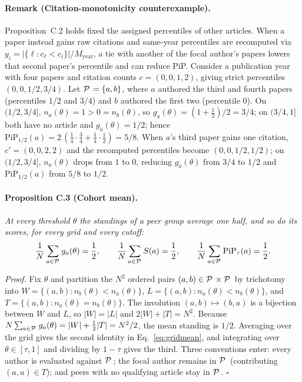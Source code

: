 \documentclass[11pt]{article}
\newcommand{\PiP}{\mathrm{PiP}}
\begin{document}
\paragraph{Remark (Citation-monotonicity counterexample).}
Proposition~C.2 holds fixed the assigned percentiles of other articles. When a paper instead gains raw citations and
same-year percentiles are recomputed via $y_i = |\{\ell : c_\ell < c_i\}|/M_{\text{year}}$, a tie with another of the
focal author's papers lowers that second paper's percentile and can reduce PiP. Consider a publication year with four
papers and citation counts $c = (0, 0, 1, 2)$, giving strict percentiles $(0, 0, 1/2, 3/4)$. Let ${\mathcal{P}\mkern2.5mu} = \{a, b\}$,
where $a$ authored the third and fourth papers (percentiles $1/2$ and $3/4$) and $b$ authored the first two (percentile
$0$). On $(1/2, 3/4]$, $n_a(\theta) = 1 > 0 = n_b(\theta)$, so $g_a(\theta) = (1 + \tfrac12)/2 = 3/4$; on $(3/4, 1]$ both
have no article and $g_a(\theta) = 1/2$; hence $\PiP_{1/2}(a) = 2\,(\tfrac14 \cdot \tfrac34 + \tfrac14 \cdot \tfrac12) =
5/8$. When $a$'s third paper gains one citation, $c' = (0, 0, 2, 2)$ and the recomputed percentiles become $(0, 0, 1/2,
1/2)$; on $(1/2, 3/4]$, $n_a(\theta)$ drops from $1$ to $0$, reducing $g_a(\theta)$ from $3/4$ to $1/2$ and
$\PiP_{1/2}(a)$ from $5/8$ to $1/2$.

\paragraph{Proposition C.3 (Cohort mean).}
\emph{At every threshold $\theta$ the standings of a peer group average one half, and so do its scores, for every grid
and every cutoff:}
\begin{equation}
  \frac{1}{N}\sum_{a \in \Peers} g_a(\theta) = \frac{1}{2},
  \qquad
  \frac{1}{N}\sum_{a \in \Peers} S(a) = \frac{1}{2},
  \qquad
  \frac{1}{N}\sum_{a \in \Peers} \PiP_\tau(a) = \frac{1}{2} .
  \label{eq:gridmean}
\end{equation}

\noindent\emph{Proof.}
Fix $\theta$ and partition the $N^2$ ordered pairs $(a, b) \in {\mathcal{P}\mkern2.5mu} \times {\mathcal{P}\mkern2.5mu}$ by trichotomy into $W = \{(a,b) :
n_b(\theta) < n_a(\theta)\}$, $L = \{(a,b) : n_a(\theta) < n_b(\theta)\}$, and $T = \{(a,b) : n_a(\theta) =
n_b(\theta)\}$. The involution $(a, b) \mapsto (b, a)$ is a bijection between $W$ and $L$, so $|W| = |L|$ and $2|W| +
|T| = N^2$. Because $N\sum_{a \in {\mathcal{P}\mkern2.5mu}} g_a(\theta) = |W| + \tfrac12|T| = N^2/2$, the mean standing is $1/2$.
Averaging over the grid gives the second identity in Eq.~\ref{eq:gridmean}, and integrating over $\theta \in [\tau, 1]$
and dividing by $1 - \tau$ gives the third. Three conventions enter: every author is evaluated against ${\mathcal{P}\mkern2.5mu}$; the
focal author remains in ${\mathcal{P}\mkern2.5mu}$ (contributing $(a,a) \in T$); and peers with no qualifying article stay in ${\mathcal{P}\mkern2.5mu}$.
\hfill$\square$
\end{document}
